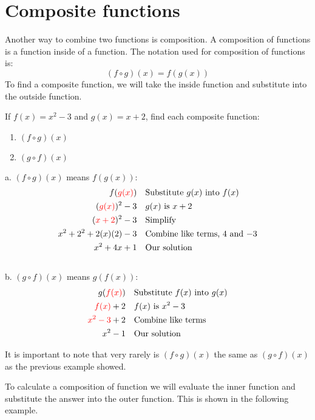 \section{Composite functions}
Another way to combine two functions is composition. A composition
of functions is a function inside of a function. The notation used for composition of functions is:
\begin{equation}
        (f\circ g)(x) = f(g(x))
\end{equation}
To find a composite function, we will take the inside function and substitute into the outside function.
\begin{exa}
    If $f(x) =x^2-3$ and $g(x) = x+2$, find each composite function:
    \begin{enumerate}[\bfseries a.]
        \item $(f \circ g)(x)$
        \item $(g \circ f)(x)$
    \end{enumerate}
\end{exa}
%
\vspace{0.2cm}
a. $(f \circ g)(x)$ means $f(g(x))$:
\begin{align*}
        f(\textcolor{red}{g(x)})&   &   &\text{Substitute $g(x)$ into $f(x)$}\\
        (\textcolor{red}{g(x)})^2-3&    &   &\text{$g(x)$ is $x+2$}\\
        (\textcolor{red}{x+2})^2-3& &   &\text{Simplify}\\
        x^2+2^2+2(x)(2) -3& &   &\text{Combine like terms, $4$ and $-3$}\\
        x^2+4x+1&   &   &\text{Our solution}
\end{align*}
%
\\[0.5cm]
%
b. $(g \circ f)(x)$ means $g(f(x))$:
\begin{align*}
        g(\textcolor{red}{f(x)})&   &   &\text{Substitute $f(x)$ into $g(x)$}\\
        \textcolor{red}{f(x)}+2&    &   &\text{$f(x)$ is $x^2-3$}\\
        \textcolor{red}{x^2-3}+2& &   &\text{Combine like terms}\\
        x^2-1& &   &\text{Our solution}
\end{align*}
\begin{nt}
    It is important to note that very rarely is $(f \circ g)(x)$ the same as $(g \circ f)(x)$ as the previous example showed.
\end{nt}
\begin{nt}
    To calculate a composition of function we will evaluate the inner function and
substitute the answer into the outer function. This is shown in the following
example.
\end{nt}
